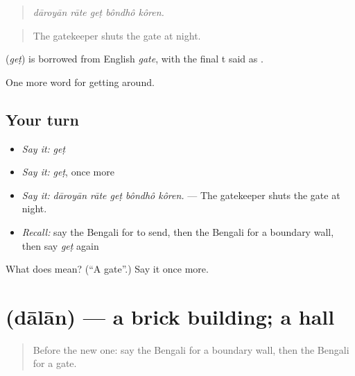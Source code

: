 \begin{quote}
    
\end{quote}

\begin{quote}
\emph{dāroyān rāte geṭ bôndhô kôren.}
\end{quote}

\begin{quote}
The gatekeeper shuts the gate at night.
\end{quote}

\begin{cousinweb}
\textbf{} (\emph{geṭ}) is borrowed from English \emph{gate}, with the final t said as .
\end{cousinweb}

\begin{grammarlens}[title={What you've built}]
One more word for getting around.
\end{grammarlens}

\subsection*{Your turn}
\begin{itemize}
\raggedright
  \item \emph{Say it:} \emph{geṭ}
  \item \emph{Say it:} \emph{geṭ}, once more
  \item \emph{Say it:} \emph{dāroyān rāte geṭ bôndhô kôren.} — The gatekeeper shuts the gate at night.
  \item \emph{Recall:} say the Bengali for to send, then the Bengali for a boundary wall, then say \emph{geṭ} again
\end{itemize}

\begin{tcolorbox}[breakable,colback=teal!4,colframe=teal!35!black,title={Before you move on}]
What does  mean? (\textquotedblleft{}A gate\textquotedblright{}.) Say it once more.
\end{tcolorbox}
\section[\texorpdfstring{\bn{দালান} (dālān)}{দালান (dālān)}]{ (dālān) — a brick building; a hall}

\label{lesson:BN-C412-dalan}



\begin{quote}
Before the new one: say the Bengali for a boundary wall, then the Bengali for a gate.
\end{quote}

